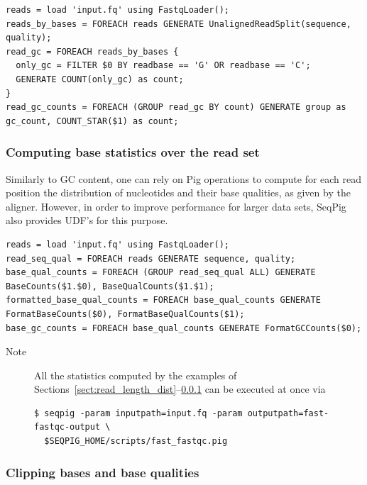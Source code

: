 \begin{lstlisting}
reads = load 'input.fq' using FastqLoader();
reads_by_bases = FOREACH reads GENERATE UnalignedReadSplit(sequence, quality);
read_gc = FOREACH reads_by_bases {
  only_gc = FILTER $0 BY readbase == 'G' OR readbase == 'C';
  GENERATE COUNT(only_gc) as count;
}
read_gc_counts = FOREACH (GROUP read_gc BY count) GENERATE group as gc_count, COUNT_STAR($1) as count;
\end{lstlisting}

\subsubsection{Computing base statistics over the read set}

\label{sect:base_stats}

Similarly to GC content, one can rely on Pig operations to compute for
each read position the distribution of nucleotides and their base
qualities, as given by the aligner. However, in order to improve
performance for larger data sets, SeqPig also provides UDF's for this
purpose.

\begin{lstlisting}
reads = load 'input.fq' using FastqLoader();
read_seq_qual = FOREACH reads GENERATE sequence, quality;
base_qual_counts = FOREACH (GROUP read_seq_qual ALL) GENERATE BaseCounts($1.$0), BaseQualCounts($1.$1);
formatted_base_qual_counts = FOREACH base_qual_counts GENERATE FormatBaseCounts($0), FormatBaseQualCounts($1);
base_gc_counts = FOREACH base_qual_counts GENERATE FormatGCCounts($0);
\end{lstlisting}

\begin{description}
	\item[Note] All the statistics computed by the examples of Sections~\ref{sect:read_length_dist}--\ref{sect:base_stats} can be executed at once via
\begin{lstlisting}
$ seqpig -param inputpath=input.fq -param outputpath=fast-fastqc-output \
  $SEQPIG_HOME/scripts/fast_fastqc.pig
\end{lstlisting}
\end{description}

\subsubsection{Clipping bases and base qualities}

\label{sect:read_clipping}

